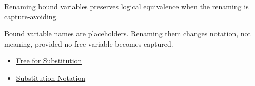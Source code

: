 \begin{remark*}[Interpretation]
Renaming bound variables preserves logical equivalence when the renaming is
capture-avoiding.

Bound variable names are placeholders. Renaming them changes notation, not
meaning, provided no free variable becomes captured.
\end{remark*}

\begin{dependencies}
\begin{itemize}
  \item \hyperref[def:free-for]{Free for Substitution}
  \item \hyperref[def:subst-notation]{Substitution Notation}
\end{itemize}
\end{dependencies}
